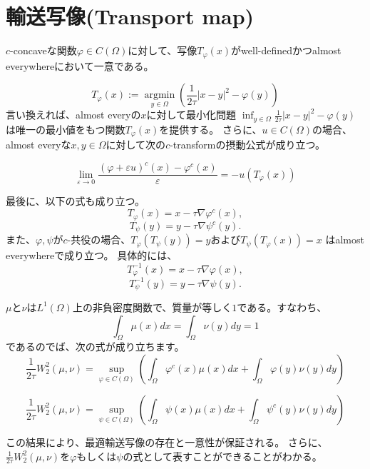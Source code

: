 \section{輸送写像(Transport map)}
\label{輸送写像(Transport map)}
\begin{prop}
    \label{prop:transport map}
    $c$-concaveな関数$\varphi \in C(\Omega)$に対して、写像$T_\varphi(x)$がwell-definedかつalmost everywhereにおいて一意である。
    
    \begin{equation}
        T_\varphi(x):= \underset{y \in \Omega} {\operatorname{argmin}}\left( \frac{1}{2 \tau} |x - y|^2 - \varphi(y) \right) 
    \end{equation}
    言い換えれば、almost everyの$x$に対して最小化問題 $\inf_{y \in \Omega} \frac{1}{2 \tau} |x - y|^2 - \varphi(y)$ は唯一の最小値をもつ関数$T_\varphi(x)$を提供する。
    さらに、$u \in C(\Omega)$の場合、almost everyな$x, y \in \Omega$に対して次の$c$-transformの摂動公式が成り立つ。
    
    \begin{equation}
        \lim_{\varepsilon \to 0} \frac{(\varphi + \varepsilon u)^c(x) - \varphi^c(x)}{\varepsilon} = - u(T_\varphi(x))
    \end{equation}
    
    最後に、以下の式も成り立つ。
    \[
        T_\varphi(x) = x - \tau \nabla \varphi^c(x),
    \]
    \[
        T_\psi(y) = y - \tau \nabla \psi^c(y).
    \]
    また、$\varphi, \psi$が$c$-共役の場合、$T_\varphi(T_\psi(y)) = y$および$T_\psi(T_\varphi(x)) = x$ はalmost everywhereで成り立つ。
    具体的には、
    \[
        T_\varphi^{-1}(x) = x - \tau \nabla \varphi(x),
    \] 
    \[
        T_\psi^{-1}(y) = y - \tau \nabla \psi(y) .
    \] 
\end{prop}

\begin{prop}
    \label{prop:wasserstein}
    $\mu$と$\nu$は$L^1(\Omega)$上の非負密度関数で、質量が等しく$1$である。すなわち、
    \[
        \int_{\Omega} \mu(x)dx = \int_{\Omega} \nu(y)dy = 1
    \]
    であるのでば、次の式が成り立ちます。
    \[
        \frac{1}{2\tau}W_2^2(\mu, \nu) = \sup_{\varphi \in C(\Omega)} \left( \int_{\Omega} \varphi^c(x) \mu(x)dx + \int_{\Omega} \varphi(y) \nu(y)dy \right) 
    \]

    \[
        \frac{1}{2\tau}W_2^2(\mu, \nu) = \sup_{\psi \in C(\Omega)} \left( \int_{\Omega} \psi(x) \mu(x)dx + \int_{\Omega} \psi^c (y) \nu(y)dy \right) 
    \]
\end{prop}
この結果により、最適輸送写像の存在と一意性が保証される。
さらに、$\frac{1}{2\tau}W_2^2(\mu, \nu)$を$\varphi$もしくは$\psi$の式として表すことができることがわかる。

